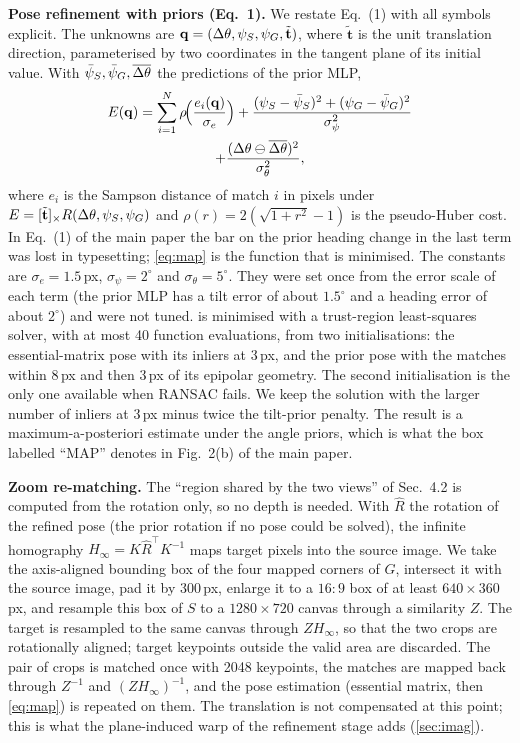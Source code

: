 \noindent\textbf{Pose refinement with priors (Eq.~1).} We restate Eq.~(1) with all symbols explicit. The unknowns are $\mathbf{q}=(\Delta\theta,\psi_S,\psi_G,\tilde{\mathbf{t}})$, where $\tilde{\mathbf{t}}$ is the unit translation direction, parameterised by two coordinates in the tangent plane of its initial value. With $\bar\psi_S,\bar\psi_G,\overline{\Delta\theta}$ the predictions of the prior MLP,
\begin{multline}
E(\mathbf{q})=\sum_{i=1}^{N}\rho\!\Big(\frac{e_i(\mathbf{q})}{\sigma_e}\Big)+\frac{(\psi_S-\bar\psi_S)^2+(\psi_G-\bar\psi_G)^2}{\sigma_\psi^2}\\
+\frac{(\Delta\theta\ominus\overline{\Delta\theta})^2}{\sigma_\theta^2},
\label{eq:map}
\end{multline}
where $e_i$ is the Sampson distance of match $i$ in pixels under $E=[\tilde{\mathbf{t}}]_\times R(\Delta\theta,\psi_S,\psi_G)$ and $\rho(r)=2(\sqrt{1+r^2}-1)$ is the pseudo-Huber cost. In Eq.~(1) of the main paper the bar on the prior heading change in the last term was lost in typesetting; \cref{eq:map} is the function that is minimised. The constants are $\sigma_e{=}1.5$\,px, $\sigma_\psi{=}2^\circ$ and $\sigma_\theta{=}5^\circ$. They were set once from the error scale of each term (the prior MLP has a tilt error of about $1.5^\circ$ and a heading error of about $2^\circ$) and were not tuned.  is minimised with a trust-region least-squares solver, with at most 40 function evaluations, from two initialisations: the essential-matrix pose with its inliers at 3\,px, and the prior pose with the matches within 8\,px and then 3\,px of its epipolar geometry. The second initialisation is the only one available when RANSAC fails. We keep the solution with the larger number of inliers at 3\,px minus twice the tilt-prior penalty. The result is a maximum-a-posteriori estimate under the angle priors, which is what the box labelled ``MAP'' denotes in Fig.~2(b) of the main paper.

\noindent\textbf{Zoom re-matching.} The ``region shared by the two views'' of Sec.~4.2 is computed from the rotation only, so no depth is needed. With $\hat R$ the rotation of the refined pose (the prior rotation if no pose could be solved), the infinite homography $H_\infty=K\hat R^{\!\top}K^{-1}$ maps target pixels into the source image. We take the axis-aligned bounding box of the four mapped corners of $G$, intersect it with the source image, pad it by 300\,px, enlarge it to a $16{:}9$ box of at least $640{\times}360$\,px, and resample this box of $S$ to a $1280{\times}720$ canvas through a similarity $Z$. The target is resampled to the same canvas through $ZH_\infty$, so that the two crops are rotationally aligned; target keypoints outside the valid area are discarded. The pair of crops is matched once with 2048 keypoints, the matches are mapped back through $Z^{-1}$ and $(ZH_\infty)^{-1}$, and the pose estimation (essential matrix, then \cref{eq:map}) is repeated on them. The translation is not compensated at this point; this is what the plane-induced warp of the refinement stage adds (\cref{sec:imag}).

